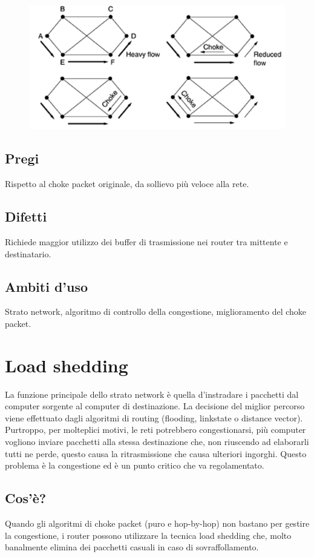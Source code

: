 \begin{figure}[H]
\centering
\includegraphics[scale=0.6]{res/img/36_ChokePacketHopbHop.png}
\end{figure}
 
\subsection{Pregi}
Rispetto al choke packet originale, da sollievo più veloce alla rete.
\subsection{Difetti}
Richiede maggior utilizzo dei buffer di trasmissione nei router tra mittente e destinatario.
\subsection{Ambiti d'uso}
Strato network, algoritmo di controllo della congestione, miglioramento del choke packet.

\section{Load shedding}
La funzione principale dello strato network è quella d'instradare i pacchetti dal computer sorgente al computer di destinazione. La decisione del miglior percorso viene effettuato dagli algoritmi di routing (flooding, linkstate o distance vector). Purtroppo, per molteplici motivi, le reti potrebbero congestionarsi, più computer vogliono inviare pacchetti alla stessa destinazione che, non riuscendo ad elaborarli tutti ne perde, questo causa la ritrasmissione che causa ulteriori ingorghi. Questo problema è la congestione ed è un punto critico che va regolamentato.
\subsection{Cos'è?}
Quando gli algoritmi di choke packet (puro e hop-by-hop) non bastano per gestire la congestione, i router possono utilizzare la tecnica load shedding che, molto banalmente elimina dei pacchetti casuali in caso di sovraffollamento.

